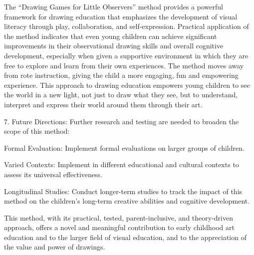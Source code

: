 \documentclass{article}
\begin{document}
The “Drawing Games for Little Observers” method provides a powerful framework for drawing education that emphasizes the development of visual literacy through play, collaboration, and self-expression. Practical application of the method indicates that even young children can achieve significant improvements in their observational drawing skills and overall cognitive development, especially when given a supportive environment in which they are free to explore and learn from their own experiences. The method moves away from rote instruction, giving the child a more engaging, fun and empowering experience.
This approach to drawing education empowers young children to see the world in a new light, not just to draw what they see, but to understand, interpret and express their world around them through their art.

7. Future Directions:
Further research and testing are needed to broaden the scope of this method:

Formal Evaluation: Implement formal evaluations on larger groups of children.

Varied Contexts: Implement in different educational and cultural contexts to assess its universal effectiveness.

Longitudinal Studies: Conduct longer-term studies to track the impact of this method on the children’s long-term creative abilities and cognitive development.

This method, with its practical, tested, parent-inclusive, and theory-driven approach, offers a novel and meaningful contribution to early childhood art education and to the larger field of visual education, and to the appreciation of the value and power of drawings.








\end{document}

